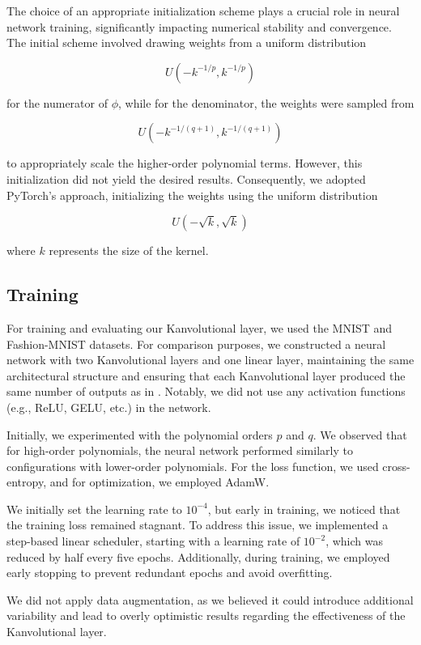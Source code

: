 \documentclass[conference]{IEEEtran}
\begin{document}
The choice of an appropriate initialization scheme plays a crucial role in
neural network training, significantly impacting numerical stability and
convergence. The initial scheme involved drawing weights from a uniform
distribution

$$
    U\left(-k^{-1/p}, k^{-1/p}\right)
$$

for the numerator of \( \phi \), while for the denominator, the weights were
sampled from

$$
    U\left(-k^{-1/(q+1)}, k^{-1/(q+1)}\right)
$$

to appropriately scale the higher-order polynomial terms. However, this
initialization did not yield the desired results. Consequently, we adopted
PyTorch's approach, initializing the weights using the uniform distribution

$$
    U\left(-\sqrt{k}, \sqrt{k}\right)
$$

where \( k \) represents the size of the kernel.

\subsection{Training}
For training and evaluating our Kanvolutional layer, we used the MNIST and
Fashion-MNIST datasets. For comparison purposes, we constructed a neural
network with two Kanvolutional layers and one linear layer, maintaining the
same architectural structure and ensuring that each Kanvolutional layer
produced the same number of outputs as in \cite{CNN-KAN}. Notably, we did not
use any activation functions (e.g., ReLU, GELU, etc.) in the network.

Initially, we experimented with the polynomial orders \( p \) and \( q \). We
observed that for high-order polynomials, the neural network performed
similarly to configurations with lower-order polynomials. For the loss
function, we used cross-entropy, and for optimization, we employed AdamW.

We initially set the learning rate to \(10^{-4}\), but early in training, we
noticed that the training loss remained stagnant. To address this issue, we
implemented a step-based linear scheduler, starting with a learning rate of
\(10^{-2}\), which was reduced by half every five epochs. Additionally, during
training, we employed early stopping to prevent redundant epochs and avoid
overfitting.

We did not apply data augmentation, as we believed it could introduce
additional variability and lead to overly optimistic results regarding the
effectiveness of the Kanvolutional layer.
\end{document}
